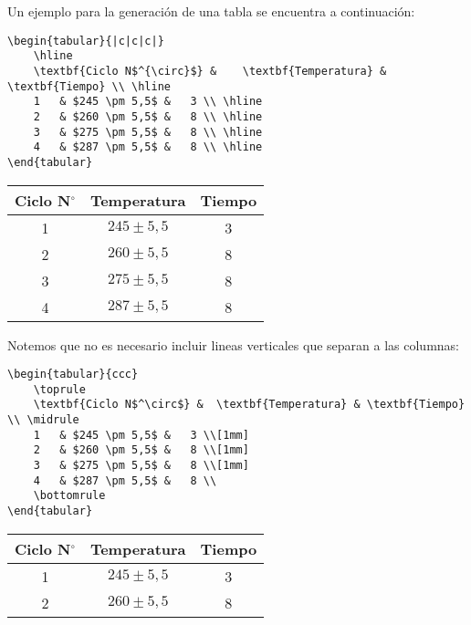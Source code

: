 \documentclass[a4,10pt]{aleph-notas}
\begin{document}
Un ejemplo para la generación de una tabla se encuentra a continuación:

\begin{lstlisting}[frame=single]
\begin{tabular}{|c|c|c|}
    \hline
    \textbf{Ciclo N$^{\circ}$} &	\textbf{Temperatura} & \textbf{Tiempo} \\ \hline
    1   & $245 \pm 5,5$ &	3 \\ \hline
    2	& $260 \pm 5,5$ &	8 \\ \hline
    3	& $275 \pm 5,5$ &	8 \\ \hline
    4	& $287 \pm 5,5$ &	8 \\ \hline
\end{tabular}
\end{lstlisting}

\begin{center}
  \begin{tabular}{|c|c|c|}
   \hline
    \textbf{Ciclo N$^{\circ}$} &	\textbf{Temperatura} & \textbf{Tiempo} \\ \hline
    1   & $245 \pm 5,5$ &	3 \\ \hline
    2	& $260 \pm 5,5$ &	8 \\ \hline
    3	& $275 \pm 5,5$ &	8 \\ \hline
    4	& $287 \pm 5,5$ &	8 \\ \hline
  \end{tabular}
\end{center}

Notemos que no es necesario incluir lineas verticales que separan a las columnas:

\begin{lstlisting}[frame=single]
\begin{tabular}{ccc}
    \toprule
    \textbf{Ciclo N$^\circ$} &	\textbf{Temperatura} & \textbf{Tiempo} \\ \midrule
    1   & $245 \pm 5,5$ &	3 \\[1mm]
    2	& $260 \pm 5,5$ &	8 \\[1mm]
    3	& $275 \pm 5,5$ &	8 \\[1mm]
    4	& $287 \pm 5,5$ &	8 \\
    \bottomrule
\end{tabular}
\end{lstlisting}


\begin{center}
  \begin{tabular}{|cc|c|}
   \hline
    \textbf{Ciclo N$^\circ$} &	\textbf{Temperatura} & \textbf{Tiempo} \\ \hline
    1   & $245 \pm 5,5$ &	3 \\
    2	& $260 \pm 5,5$ &	8 \\
    \hline
  \end{tabular}
\end{center}
\end{document}
